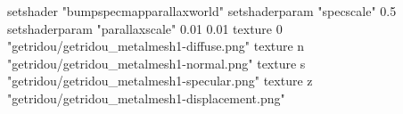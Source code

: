 setshader "bumpspecmapparallaxworld"
setshaderparam "specscale" 0.5
setshaderparam "parallaxscale" 0.01 0.01
texture 0 "getridou/getridou_metalmesh1-diffuse.png"
texture n "getridou/getridou_metalmesh1-normal.png"
texture s "getridou/getridou_metalmesh1-specular.png"
texture z "getridou/getridou_metalmesh1-displacement.png"
